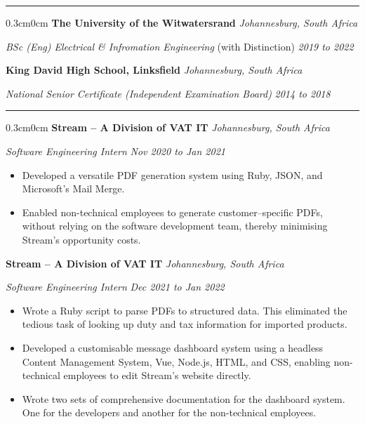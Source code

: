\documentclass[10pt, a4paper]{article}
\newcommand{\rangesep}{to\xspace}  %
\renewcommand{\date}[1]{\textit{#1}}
\newcommand{\location}[1]{\textit{#1}}
\newcommand{\heading}[1]{
\makebox[0pt][l]{\Large \sc \hspace{2pt}#1}
\rule[-0.7ex]{\columnwidth}{0.5pt}\vspace{1.0ex}
}
\newcommand{\subheading}[1]{{\bfseries #1}}
\newcommand{\subheadSkip}{\vspace{0.7ex}}
\newenvironment{mysection}[1]
{\vspace{2.5ex}
\heading{#1}
\begin{adjustwidth}{0.3cm}{0cm}}
{\end{adjustwidth} }
\begin{document}
\begin{mysection}{Education}
        \subheading{The University of the Witwatersrand} \hfill \location{Johannesburg, South Africa}

        \textit{BSc (Eng) Electrical \& Infromation Engineering} (with Distinction) \hfill \date{2019 \rangesep  2022}
            
        \subheadSkip
        \subheading{King David High School, Linksfield} \hfill  \location{Johannesburg, South Africa}

\textit{National Senior Certificate (Independent Examination Board)} \hfill \date{2014 \rangesep 2018}
    \end{mysection}
\begin{mysection}{Experience}
 \subheadSkip
        \subheading{Stream -- A Division of VAT IT} \hfill \location{Johannesburg, South Africa}

        \textit{Software Engineering Intern}  \hfill \date{Nov 2020 \rangesep Jan 2021}

        \begin{itemize}
            \item Developed a versatile PDF generation system using Ruby, JSON, and Microsoft's Mail Merge.
            \item Enabled non-technical employees to generate customer--specific PDFs, without relying on the software development team, thereby minimising Stream's opportunity costs.
        \end{itemize}   
\subheadSkip
        \subheading{Stream -- A Division of VAT IT} \hfill \location{Johannesburg, South Africa}

        \textit{Software Engineering Intern}  \hfill \date{Dec 2021 \rangesep Jan 2022}

        \begin{itemize}
         \item Wrote a Ruby script to parse PDFs to structured data. This eliminated the tedious task of looking up duty and tax information for imported products.
    \item Developed a customisable message dashboard system using a headless Content Management System, Vue, Node.js, HTML, and CSS, enabling non-technical employees to edit Stream's website directly.
    \item Wrote two sets of comprehensive documentation for the dashboard system. One for the developers and another for the non-technical employees.
        \end{itemize}           
\end{mysection}
\end{document}
